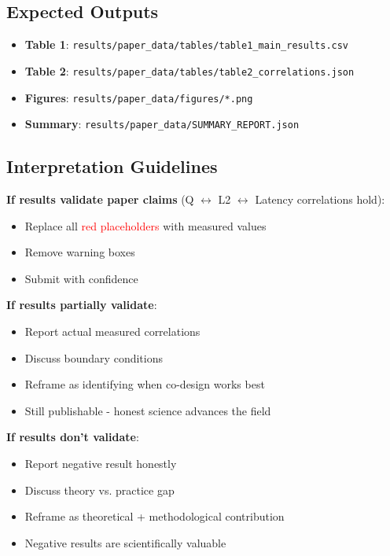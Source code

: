 \documentclass{article}
\begin{document}
\subsection{Expected Outputs}

\begin{itemize}
    \item \textbf{Table 1}: \texttt{results/paper\_data/tables/table1\_main\_results.csv}
    \item \textbf{Table 2}: \texttt{results/paper\_data/tables/table2\_correlations.json}
    \item \textbf{Figures}: \texttt{results/paper\_data/figures/*.png}
    \item \textbf{Summary}: \texttt{results/paper\_data/SUMMARY\_REPORT.json}
\end{itemize}

\subsection{Interpretation Guidelines}

\textbf{If results validate paper claims} (Q $\leftrightarrow$ L2 $\leftrightarrow$ Latency correlations hold):
\begin{itemize}
    \item Replace all \textcolor{red}{red placeholders} with measured values
    \item Remove warning boxes
    \item Submit with confidence
\end{itemize}

\textbf{If results partially validate}:
\begin{itemize}
    \item Report actual measured correlations
    \item Discuss boundary conditions
    \item Reframe as identifying when co-design works best
    \item Still publishable - honest science advances the field
\end{itemize}

\textbf{If results don't validate}:
\begin{itemize}
    \item Report negative result honestly
    \item Discuss theory vs. practice gap
    \item Reframe as theoretical + methodological contribution
    \item Negative results are scientifically valuable
\end{itemize}
\end{document}
